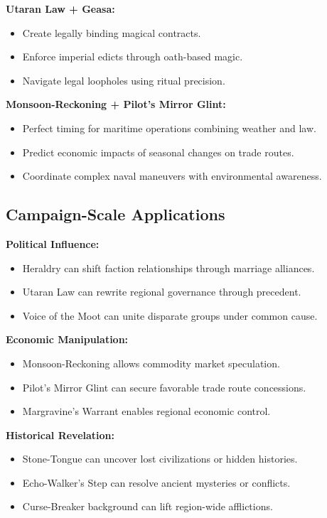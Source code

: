 \textbf{Utaran Law + Geasa:}
\begin{itemize}
\item Create legally binding magical contracts.
\item Enforce imperial edicts through oath-based magic.
\item Navigate legal loopholes using ritual precision.
\end{itemize}

\textbf{Monsoon-Reckoning + Pilot's Mirror Glint:}
\begin{itemize}
\item Perfect timing for maritime operations combining weather and law.
\item Predict economic impacts of seasonal changes on trade routes.
\item Coordinate complex naval maneuvers with environmental awareness.
\end{itemize}

\subsection{Campaign-Scale Applications}
\label{subsec:campaign-scale}

\textbf{Political Influence:}
\begin{itemize}
\item Heraldry can shift faction relationships through marriage alliances.
\item Utaran Law can rewrite regional governance through precedent.
\item Voice of the Moot can unite disparate groups under common cause.
\end{itemize}

\textbf{Economic Manipulation:}
\begin{itemize}
\item Monsoon-Reckoning allows commodity market speculation.
\item Pilot's Mirror Glint can secure favorable trade route concessions.
\item Margravine's Warrant enables regional economic control.
\end{itemize}

\textbf{Historical Revelation:}
\begin{itemize}
\item Stone-Tongue can uncover lost civilizations or hidden histories.
\item Echo-Walker's Step can resolve ancient mysteries or conflicts.
\item Curse-Breaker background can lift region-wide afflictions.
\end{itemize}

